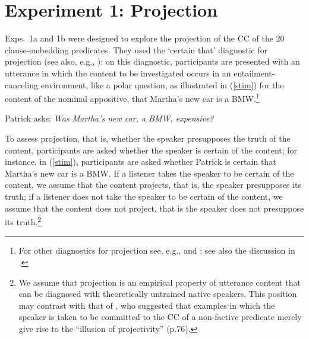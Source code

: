 \documentclass[11pt,fleqn]{article}
\newcommand{\6}{\mbox{$[\hspace*{-.6mm}[$}}
\newcommand{\9}{\mbox{$]\hspace*{-.6mm}]$}}
\begin{document}
%
%
%
%


\section{Experiment 1: Projection}\label{s2}

Exps.~1a and 1b were designed to explore the projection of the CC of the 20 clause-embedding predicates. They used the `certain that' diagnostic for projection (see also, e.g., \citealt{tonhauser-salt26,djaerv-bacovcin-salt27,stevens-etal2017,tbd-variability,mahler-nels,demarneffe-etal-sub23}): on this diagnostic, participants are presented with an utterance in which the content to be investigated occurs in an entailment-canceling environment, like a polar question, as illustrated in (\ref{stim}) for the content of the nominal appositive, that Martha's new car is a BMW.\footnote{For other diagnostics for projection see, e.g., \citealt{smith-hall11,xue-onea11} and \citealt{brst-lang11}; see also the discussion in \citealt{tbd-variability}.} 

\begin{exe}

\ex\label{stim} Patrick asks: {\em Was Martha's new car, a BMW, expensive?} 

\end{exe}
To assess projection, that is, whether the speaker presupposes the truth of the content, participants are asked whether the speaker is certain of the content; for instance, in (\ref{stim}), participants are asked whether Patrick is certain that Martha's new car is a BMW. If a listener takes the speaker to be certain of the content, we assume that the content projects, that is, the speaker presupposes its truth; if a listener does not take the speaker to be certain of the content, we assume that the content does not project, that is the speaker does not presuppose its truth.\footnote{We assume that projection is an empirical property of utterance content that can be diagnosed with theoretically untrained native speakers. This position may contrast with that of \citet{anand-hacquard2014}, who suggested that examples in which the speaker is taken to be committed to the CC of a non-factive predicate merely give rise to the ``illusion of projectivity'' (p.76).} 
\end{document}
